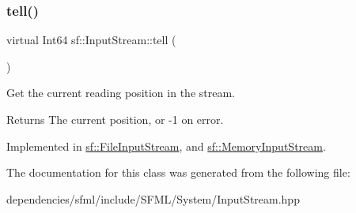 \mbox{\label{classsf_1_1_input_stream_a599515b9ccdbddb6fef5a98424fd559c}} 
\subsubsection{\texorpdfstring{tell()}{tell()}}
{\footnotesize\ttfamily virtual Int64 sf\+::\+Input\+Stream\+::tell (\begin{DoxyParamCaption}{ }\end{DoxyParamCaption})\hspace{0.3cm}{\ttfamily [pure virtual]}}



Get the current reading position in the stream. 

\begin{DoxyReturn}{Returns}
The current position, or -\/1 on error. 
\end{DoxyReturn}


Implemented in \hyperlink{classsf_1_1_file_input_stream_a768c5fdb3be79e2d71d1bce911f8741c}{sf\+::\+File\+Input\+Stream}, and \hyperlink{classsf_1_1_memory_input_stream_a7ad4bdf721f29de8f66421ff29e23ee4}{sf\+::\+Memory\+Input\+Stream}.



The documentation for this class was generated from the following file\+:\begin{DoxyCompactItemize}
\item 
dependencies/sfml/include/\+S\+F\+M\+L/\+System/Input\+Stream.\+hpp\end{DoxyCompactItemize}
